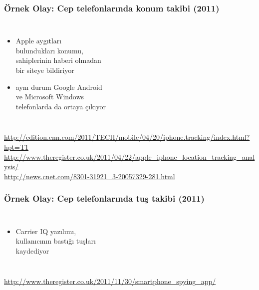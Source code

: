 \documentclass[dvipsnames]{beamer}
\theoremstyle{definition}
\theoremstyle{example}
\theoremstyle{plain}
\begin{document}
\begin{frame}
  \frametitle{Örnek Olay: Cep telefonlarında konum takibi (2011)}

  \begin{columns}

    \begin{itemize}
      \item Apple aygıtları\\
        bulundukları konumu,\\
        sahiplerinin haberi olmadan\\
        bir siteye bildiriyor
      \item aynı durum Google Android\\
        ve Microsoft Windows\\
        telefonlarda da ortaya çıkıyor
    \end{itemize}
  \end{columns}

  \medskip
  \tiny{\url{http://edition.cnn.com/2011/TECH/mobile/04/20/iphone.tracking/index.html?hpt=T1}}\\
  \tiny{\url{http://www.theregister.co.uk/2011/04/22/apple_iphone_location_tracking_analysis/}}\\
  \tiny{\url{http://news.cnet.com/8301-31921_3-20057329-281.html}}\\
\end{frame}

\begin{frame}
  \frametitle{Örnek Olay: Cep telefonlarında tuş takibi (2011)}

  \begin{columns}

    \begin{itemize}
      \item Carrier IQ yazılımı,\\
        kullanıcının bastığı tuşları\\
        kaydediyor
    \end{itemize}
  \end{columns}

  \medskip
  \tiny{\url{http://www.theregister.co.uk/2011/11/30/smartphone_spying_app/}}
\end{frame}
\end{document}
